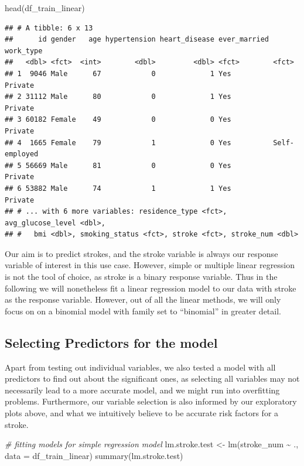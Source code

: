 \documentclass[
]{article}
\newenvironment{Shaded}{\begin{snugshade}}{\end{snugshade}}
\newcommand{\AttributeTok}[1]{\textcolor[rgb]{0.77,0.63,0.00}{#1}}
\newcommand{\CommentTok}[1]{\textcolor[rgb]{0.56,0.35,0.01}{\textit{#1}}}
\newcommand{\FunctionTok}[1]{\textcolor[rgb]{0.00,0.00,0.00}{#1}}
\newcommand{\NormalTok}[1]{#1}
\newcommand{\OtherTok}[1]{\textcolor[rgb]{0.56,0.35,0.01}{#1}}
\newcommand{\SpecialCharTok}[1]{\textcolor[rgb]{0.00,0.00,0.00}{#1}}
\renewcommand{\=}[1]{\stackrel{#1}{=}}
\theoremstyle{definition}
\theoremstyle{remark}
\begin{document}
\begin{Shaded}
\begin{Highlighting}[]
\FunctionTok{head}\NormalTok{(df\_train\_linear)}
\end{Highlighting}
\end{Shaded}

\begin{verbatim}
## # A tibble: 6 x 13
##      id gender   age hypertension heart_disease ever_married work_type    
##   <dbl> <fct>  <int>        <dbl>         <dbl> <fct>        <fct>        
## 1  9046 Male      67            0             1 Yes          Private      
## 2 31112 Male      80            0             1 Yes          Private      
## 3 60182 Female    49            0             0 Yes          Private      
## 4  1665 Female    79            1             0 Yes          Self-employed
## 5 56669 Male      81            0             0 Yes          Private      
## 6 53882 Male      74            1             1 Yes          Private      
## # ... with 6 more variables: residence_type <fct>, avg_glucose_level <dbl>,
## #   bmi <dbl>, smoking_status <fct>, stroke <fct>, stroke_num <dbl>
\end{verbatim}

Our aim is to predict strokes, and the stroke variable is always our response variable of interest in this use case. However, simple or multiple linear regression is not the tool of choice, as stroke is a binary response variable.
Thus in the following we will nonetheless fit a linear regression model to our data with stroke as the response variable. However, out of all the linear methods, we will only focus on on a binomial model with family set to ``binomial'' in greater detail.

\hypertarget{selecting-predictors-for-the-model}{%
\subsection{Selecting Predictors for the model}\label{selecting-predictors-for-the-model}}

Apart from testing out individual variables, we also tested a model with all predictors to find out about the significant ones, as selecting all variables may not necessarily lead to a more accurate model, and we might run into overfitting problems. Furthermore, our variable selection is also informed by our exploratory plots above, and what we intuitively believe to be accurate risk factors for a stroke.

\begin{Shaded}
\begin{Highlighting}[]
\CommentTok{\# fitting models for simple regression model}
\NormalTok{lm.stroke.test }\OtherTok{\textless{}{-}} \FunctionTok{lm}\NormalTok{(stroke\_num }\SpecialCharTok{\textasciitilde{}}\NormalTok{ ., }\AttributeTok{data =}\NormalTok{ df\_train\_linear)}
\FunctionTok{summary}\NormalTok{(lm.stroke.test)}
\end{Highlighting}
\end{Shaded}
\end{document}
